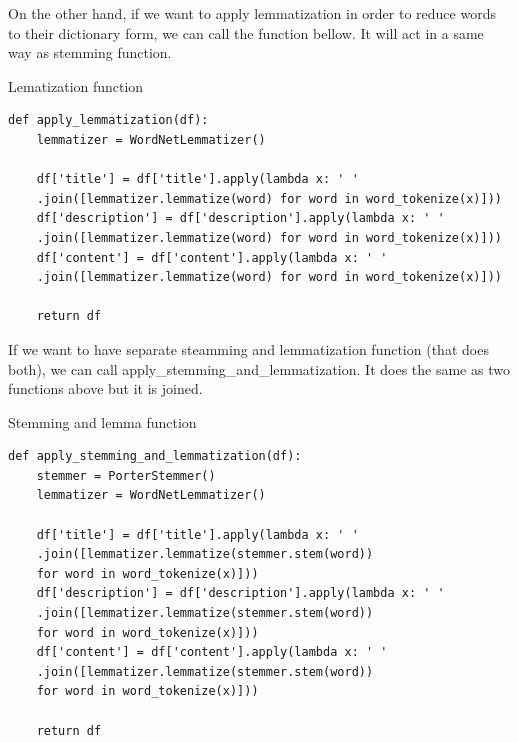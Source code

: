 On the other hand, if we want to apply lemmatization \parencite{plisson2004rule} in order to reduce words to their dictionary form, we can call the function bellow. It will act in a same way as stemming function.
\begin{listing}[H]
\caption{Lematization function}
\begin{verbatim}
def apply_lemmatization(df):
    lemmatizer = WordNetLemmatizer()

    df['title'] = df['title'].apply(lambda x: ' '
    .join([lemmatizer.lemmatize(word) for word in word_tokenize(x)]))
    df['description'] = df['description'].apply(lambda x: ' '
    .join([lemmatizer.lemmatize(word) for word in word_tokenize(x)]))
    df['content'] = df['content'].apply(lambda x: ' '
    .join([lemmatizer.lemmatize(word) for word in word_tokenize(x)]))

    return df
\end{verbatim}
\end{listing}

If we want to have separate steamming and lemmatization function (that does both), we can call apply\_stemming\_and\_lemmatization. It does the same as two functions above but it is joined.
\begin{listing}[H]
\caption{Stemming and lemma function}
\begin{verbatim}
def apply_stemming_and_lemmatization(df):
    stemmer = PorterStemmer()
    lemmatizer = WordNetLemmatizer()

    df['title'] = df['title'].apply(lambda x: ' '
    .join([lemmatizer.lemmatize(stemmer.stem(word)) 
    for word in word_tokenize(x)]))
    df['description'] = df['description'].apply(lambda x: ' '
    .join([lemmatizer.lemmatize(stemmer.stem(word)) 
    for word in word_tokenize(x)]))
    df['content'] = df['content'].apply(lambda x: ' '
    .join([lemmatizer.lemmatize(stemmer.stem(word)) 
    for word in word_tokenize(x)]))

    return df
\end{verbatim}
\end{listing}

